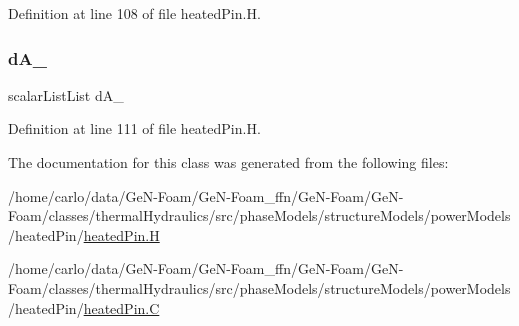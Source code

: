 Definition at line 108 of file heated\+Pin.\+H.

\mbox{\label{classFoam_1_1powerModels_1_1heatedPin_a753fe594accfbeba343f55dfdf274a0f}} 
\subsubsection{\texorpdfstring{d\+A\+\_\+}{dA\_}}
{\footnotesize\ttfamily scalar\+List\+List d\+A\+\_\+\hspace{0.3cm}{\ttfamily [protected]}}



Definition at line 111 of file heated\+Pin.\+H.



The documentation for this class was generated from the following files\+:\begin{DoxyCompactItemize}
\item 
/home/carlo/data/\+Ge\+N-\/\+Foam/\+Ge\+N-\/\+Foam\+\_\+ffn/\+Ge\+N-\/\+Foam/\+Ge\+N-\/\+Foam/classes/thermal\+Hydraulics/src/phase\+Models/structure\+Models/power\+Models/heated\+Pin/\hyperlink{heatedPin_8H}{heated\+Pin.\+H}\item 
/home/carlo/data/\+Ge\+N-\/\+Foam/\+Ge\+N-\/\+Foam\+\_\+ffn/\+Ge\+N-\/\+Foam/\+Ge\+N-\/\+Foam/classes/thermal\+Hydraulics/src/phase\+Models/structure\+Models/power\+Models/heated\+Pin/\hyperlink{heatedPin_8C}{heated\+Pin.\+C}\end{DoxyCompactItemize}
